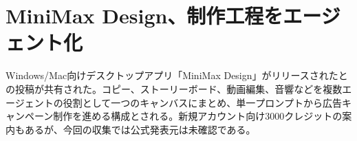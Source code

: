 \section{MiniMax Design、制作工程をエージェント化}
Windows/Mac向けデスクトップアプリ「MiniMax Design」がリリースされたとの投稿が共有された。コピー、ストーリーボード、動画編集、音響などを複数エージェントの役割として一つのキャンバスにまとめ、単一プロンプトから広告キャンペーン制作を進める構成とされる。新規アカウント向け3000クレジットの案内もあるが、今回の収集では公式発表元は未確認である。
